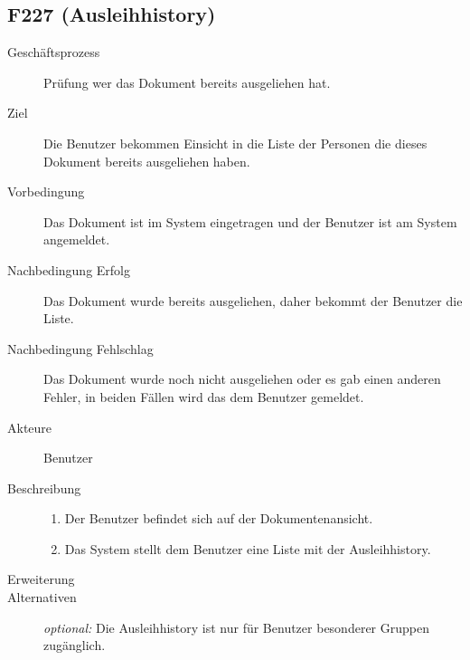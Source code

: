 \subsection{F227 (Ausleihhistory)}
\begin{description}
  \item[Geschäftsprozess]Prüfung wer das Dokument bereits ausgeliehen hat.
  \item[Ziel]Die Benutzer bekommen Einsicht in die Liste der Personen die dieses Dokument bereits ausgeliehen haben.
  \item[Vorbedingung]Das Dokument ist im System eingetragen und der Benutzer ist am System angemeldet.
  \item[Nachbedingung Erfolg]Das Dokument wurde bereits ausgeliehen, daher bekommt der Benutzer die Liste.
  \item[Nachbedingung Fehlschlag]Das Dokument wurde noch nicht ausgeliehen oder es gab einen anderen Fehler, in beiden Fällen wird das dem Benutzer gemeldet.
  \item[Akteure]Benutzer
  \item[Beschreibung]\hfill
    \begin{enumerate}
      \item Der Benutzer befindet sich auf der Dokumentenansicht.
      \item Das System stellt dem Benutzer eine Liste mit der Ausleihhistory.
    \end{enumerate}
  \item[Erweiterung]
  \item[Alternativen]\emph{optional:} Die Ausleihhistory ist nur für Benutzer besonderer Gruppen zugänglich.
\end{description}

